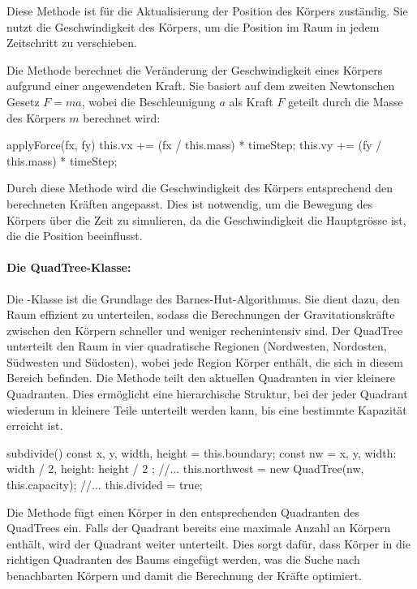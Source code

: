 \documentclass[a4paper,12pt,twoside]{article}
\begin{document}
Diese Methode ist für die Aktualisierung der Position des Körpers zuständig. Sie nutzt die Geschwindigkeit des Körpers, um die Position im Raum in jedem Zeitschritt zu verschieben.

Die Methode  berechnet die Veränderung der Geschwindigkeit eines Körpers aufgrund einer angewendeten Kraft. Sie basiert auf dem zweiten Newtonschen Gesetz \(F = ma\), wobei die Beschleunigung \(a\) als Kraft \(F\) geteilt durch die Masse des Körpers \(m\) berechnet wird:

\begin{javascript}
applyForce(fx, fy) {
    this.vx += (fx / this.mass) * timeStep;
    this.vy += (fy / this.mass) * timeStep;
}
\end{javascript}

Durch diese Methode wird die Geschwindigkeit des Körpers entsprechend den berechneten Kräften angepasst. Dies ist notwendig, um die Bewegung des Körpers über die Zeit zu simulieren, da die Geschwindigkeit die Hauptgrösse ist, die die Position beeinflusst.

\paragraph{Die QuadTree-Klasse:}
Die -Klasse ist die Grundlage des Barnes-Hut-Algorithmus. Sie dient dazu, den Raum effizient zu unterteilen, sodass die Berechnungen der Gravitationskräfte zwischen den Körpern schneller und weniger rechenintensiv sind. Der QuadTree unterteilt den Raum in vier quadratische Regionen (Nordwesten, Nordosten, Südwesten und Südosten), wobei jede Region Körper enthält, die sich in diesem Bereich befinden. Die Methode  teilt den aktuellen Quadranten in vier kleinere Quadranten. Dies ermöglicht eine hierarchische Struktur, bei der jeder Quadrant wiederum in kleinere Teile unterteilt werden kann, bis eine bestimmte Kapazität erreicht ist.

\begin{javascript}
subdivide() {
    const { x, y, width, height } = this.boundary;
    const nw = { x, y, width: width / 2, height: height / 2 };
	//...
    this.northwest = new QuadTree(nw, this.capacity);
	//...
    this.divided = true;
}
\end{javascript}

Die Methode  fügt einen Körper in den entsprechenden Quadranten des QuadTrees ein. Falls der Quadrant bereits eine maximale Anzahl an Körpern enthält, wird der Quadrant weiter unterteilt. Dies sorgt dafür, dass Körper in die richtigen Quadranten des Baums eingefügt werden, was die Suche nach benachbarten Körpern und damit die Berechnung der Kräfte optimiert.
\end{document}
